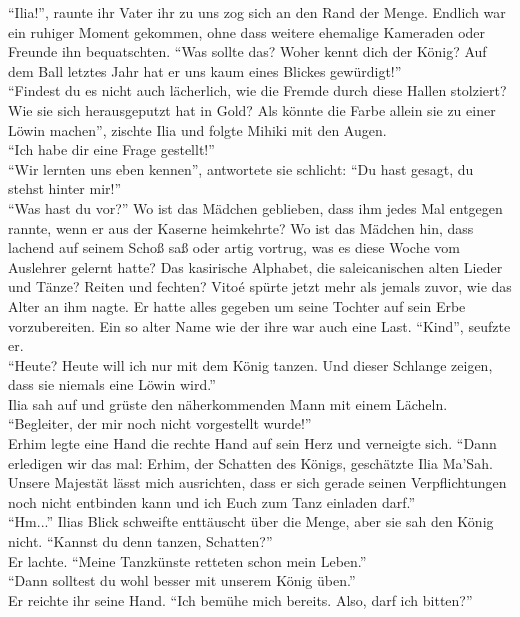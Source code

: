 ``Ilia!'', raunte ihr Vater ihr zu uns zog sich an den Rand der Menge. Endlich war ein ruhiger 
Moment gekommen, ohne dass weitere ehemalige Kameraden oder Freunde ihn bequatschten. ``Was sollte 
das? Woher kennt dich der König? Auf dem Ball letztes Jahr hat er uns kaum eines Blickes 
gewürdigt!''\\
``Findest du es nicht auch lächerlich, wie die Fremde durch diese Hallen stolziert? Wie sie sich 
herausgeputzt hat in Gold? Als könnte die Farbe allein sie zu einer Löwin machen'', zischte Ilia 
und folgte Mihiki mit den Augen.\\
``Ich habe dir eine Frage gestellt!''\\
``Wir lernten uns eben kennen'', antwortete sie schlicht: ``Du hast gesagt, du stehst hinter 
mir!''\\
``Was hast du vor?'' Wo ist das Mädchen geblieben, dass ihm jedes Mal entgegen rannte, wenn er aus 
der Kaserne heimkehrte? Wo ist das Mädchen hin, dass lachend auf seinem Schoß saß oder artig 
vortrug, was es diese Woche vom Auslehrer gelernt hatte? Das kasirische Alphabet, die 
saleicanischen alten Lieder und Tänze? Reiten und fechten? Vitoé spürte jetzt mehr als jemals 
zuvor, wie das Alter an ihm nagte. Er hatte alles gegeben um seine Tochter auf sein Erbe 
vorzubereiten. Ein so alter Name wie der ihre war auch eine Last. ``Kind'', seufzte er.\\
``Heute? Heute will ich nur mit dem König tanzen. Und dieser Schlange zeigen, dass sie niemals eine 
Löwin wird.''\\
Ilia sah auf und grüste den näherkommenden Mann mit einem Lächeln. ``Begleiter, der mir noch nicht 
vorgestellt wurde!''\\
Erhim legte eine Hand die rechte Hand auf sein Herz und verneigte sich. ``Dann erledigen wir das 
mal: Erhim, der Schatten des Königs, geschätzte Ilia Ma'Sah. Unsere Majestät lässt mich ausrichten, 
dass er sich gerade seinen Verpflichtungen noch nicht entbinden kann und ich Euch zum Tanz einladen 
darf.''\\
``Hm...'' Ilias Blick schweifte enttäuscht über die Menge, aber sie sah den König nicht. ``Kannst 
du denn tanzen, Schatten?''\\
Er lachte. ``Meine Tanzkünste retteten schon mein Leben.''\\
``Dann solltest du wohl besser mit unserem König üben.''\\
Er reichte ihr seine Hand. ``Ich bemühe mich bereits. Also, darf ich bitten?''\\

